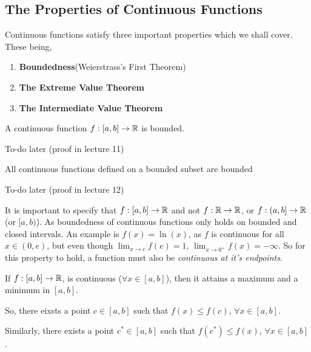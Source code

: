 \documentclass[12pt]{article}
\theoremstyle{definition}
\renewenvironment{proof}[1][\proofname]{\vspace{-10pt}\begin{replacementproof}}{\end{replacementproof}}
\newcommand{\xlim}{\lim_{x \rightarrow c}}
\begin{document}
        \subsection{The Properties of Continuous Functions}
        Continuous functions satisfy three important properties which we shall cover. These being,
        \begin{enumerate}
            \item \textbf{Boundedness}(Weierstrass's First Theorem)
            \item \textbf{The Extreme Value Theorem}
            \item \textbf{The Intermediate Value Theorem}
        \end{enumerate}
        \begin{lemma}
            A continuous function $f: [a, b] \rightarrow \R$ is bounded.
        \end{lemma}
        \begin{proof}
            To-do later (proof in lecture 11)
        \end{proof}
        \begin{theorem}
            All continuous functions defined on a bounded subset are bounded
        \end{theorem}
        \begin{proof}
            To-do later (proof in lecture 12)
        \end{proof}
        \begin{remark}
            It is important to specify that $f: [a, b] \rightarrow \R$ and not $f: \R \rightarrow \R$, or $f: (a, b] \rightarrow \R$ (or $[a, b)$). As boundedness of continuous functions only holds on bounded and closed intervals. An example is $f(x) = \ln(x)$, as $f$ is continuous for all $x \in (0, e)$, but even though $\xlim f(e) = 1$, $\lim_{x \rightarrow 0^{+}}f(x) = -\infty$. So for this property to hold, a function must also be \emph{continuous at it's endpoints}.
        \end{remark}
        \begin{theorem}
            If $f: [a, b] \rightarrow \R$, is continuous ($\forall x \in [a, b]$), then it attains a maximum and a minimum in $[a, b]$. 

            So, there eixsts a point $c \in [a, b]$ such that $f(x) \leq f(c)$, $\forall x \in [a, b]$.

            Similarly, there exists a point $c^{\ast} \in [a, b]$ such that $f(c^{\ast}) \leq f(x)$, $\forall x \in [a, b]$. 
        \end{theorem}
\end{document}
